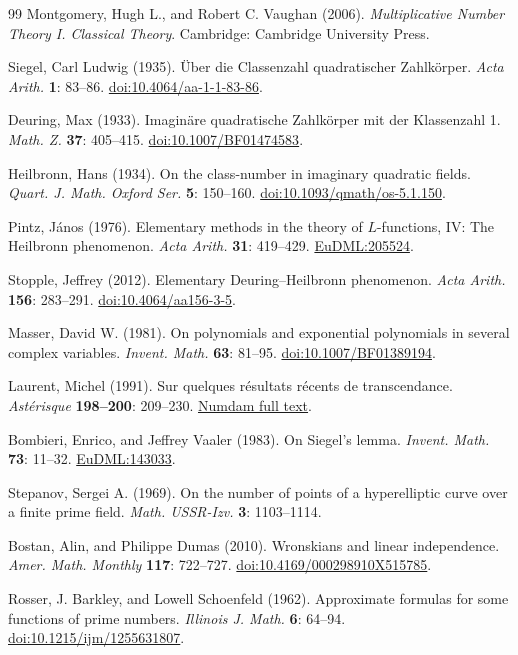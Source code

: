 \documentclass[11pt,twoside,leqno]{article}
\theoremstyle{apostol}
\begin{document}
\begin{thebibliography}{99}
Montgomery, Hugh L., and Robert C. Vaughan (2006).
\emph{Multiplicative Number Theory I. Classical Theory}. Cambridge:
Cambridge University Press.

Siegel, Carl Ludwig (1935). \"Uber die Classenzahl quadratischer
Zahlk\"orper. \emph{Acta Arith.} \textbf{1}: 83--86.
\href{https://doi.org/10.4064/aa-1-1-83-86}
{doi:10.4064/aa-1-1-83-86}.

Deuring, Max (1933). Imagin\"are quadratische Zahlk\"orper mit der
Klassenzahl 1. \emph{Math. Z.} \textbf{37}: 405--415.
\href{https://doi.org/10.1007/BF01474583}{doi:10.1007/BF01474583}.

Heilbronn, Hans (1934). On the class-number in imaginary quadratic fields.
\emph{Quart. J. Math. Oxford Ser.} \textbf{5}: 150--160.
\href{https://doi.org/10.1093/qmath/os-5.1.150}
{doi:10.1093/qmath/os-5.1.150}.

Pintz, J\'anos (1976). Elementary methods in the theory of \(L\)-functions,
IV: The Heilbronn phenomenon. \emph{Acta Arith.} \textbf{31}: 419--429.
\href{https://eudml.org/doc/205524}{EuDML:205524}.

Stopple, Jeffrey (2012). Elementary Deuring--Heilbronn phenomenon.
\emph{Acta Arith.} \textbf{156}: 283--291.
\href{https://doi.org/10.4064/aa156-3-5}{doi:10.4064/aa156-3-5}.

Masser, David W. (1981). On polynomials and exponential polynomials in
several complex variables. \emph{Invent. Math.} \textbf{63}: 81--95.
\href{https://doi.org/10.1007/BF01389194}{doi:10.1007/BF01389194}.

Laurent, Michel (1991). Sur quelques r\'esultats r\'ecents de transcendance.
\emph{Ast\'erisque} \textbf{198--200}: 209--230.
\href{https://www.numdam.org/item/AST_1991__198-199-200__209_0/}
{Numdam full text}.

Bombieri, Enrico, and Jeffrey Vaaler (1983). On Siegel's lemma.
\emph{Invent. Math.} \textbf{73}: 11--32.
\href{https://eudml.org/doc/143033}{EuDML:143033}.

Stepanov, Sergei A. (1969). On the number of points of a hyperelliptic
curve over a finite prime field. \emph{Math. USSR-Izv.} \textbf{3}:
1103--1114.

Bostan, Alin, and Philippe Dumas (2010). Wronskians and linear
independence. \emph{Amer. Math. Monthly} \textbf{117}: 722--727.
\href{https://doi.org/10.4169/000298910X515785}
{doi:10.4169/000298910X515785}.

Rosser, J. Barkley, and Lowell Schoenfeld (1962). Approximate formulas for
some functions of prime numbers. \emph{Illinois J. Math.} \textbf{6}: 64--94.
\href{https://doi.org/10.1215/ijm/1255631807}
{doi:10.1215/ijm/1255631807}.

\end{thebibliography}
\end{document}
